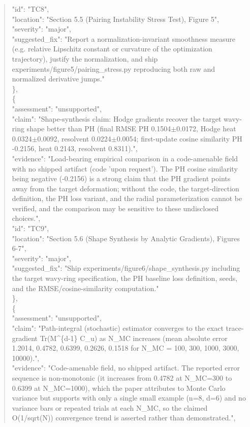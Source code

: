 \documentclass[11pt]{article}
\begin{document}
\begin{quote}
      "id": "TC8",\\
      "location": "Section 5.5 (Pairing Instability Stress Test), Figure 5",\\
      "severity": "major",\\
      "suggested\_fix": "Report a normalization-invariant smoothness measure (e.g. relative Lipschitz constant or curvature of the optimization trajectory), justify the normalization, and ship experiments/figure5/pairing\_stress.py reproducing both raw and normalized derivative jumps."\\
    \},\\
    \{\\
      "assessment": "unsupported",\\
      "claim": "Shape-synthesis claim: Hodge gradients recover the target wavy-ring shape better than PH (final RMSE PH 0.1504\ensuremath{\pm}0.0172, Hodge heat 0.0324\ensuremath{\pm}0.0092, resolvent 0.0224\ensuremath{\pm}0.0054; first-update cosine similarity PH -0.2156, heat 0.2143, resolvent 0.8311).",\\
      "evidence": "Load-bearing empirical comparison in a code-amenable field with no shipped artifact (code 'upon request'). The PH cosine similarity being negative (-0.2156) is a strong claim that the PH gradient points away from the target deformation; without the code, the target-direction definition, the PH loss variant, and the radial parameterization cannot be verified, and the comparison may be sensitive to these undisclosed choices.",\\
      "id": "TC9",\\
      "location": "Section 5.6 (Shape Synthesis by Analytic Gradients), Figures 6-7",\\
      "severity": "major",\\
      "suggested\_fix": "Ship experiments/figure6/shape\_synthesis.py including the target wavy-ring specification, the PH baseline loss definition, seeds, and the RMSE/cosine-similarity computation."\\
    \},\\
    \{\\
      "assessment": "unsupported",\\
      "claim": "Path-integral (stochastic) estimator converges to the exact trace-gradient Tr(M\^{}\{d-1\} C\_u) as N\_MC increases (mean absolute error 1.2014, 0.4782, 0.6399, 0.2626, 0.1518 for N\_MC = 100, 300, 1000, 3000, 10000).",\\
      "evidence": "Code-amenable field, no shipped artifact. The reported error sequence is non-monotonic (it increases from 0.4782 at N\_MC=300 to 0.6399 at N\_MC=1000), which the paper attributes to Monte Carlo variance but supports with only a single small example (n=8, d=6) and no variance bars or repeated trials at each N\_MC, so the claimed O(1/sqrt(N)) convergence trend is asserted rather than demonstrated.",\\

\end{quote}
\end{document}
